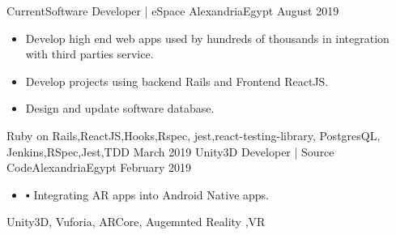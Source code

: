 \begin{experiences}
  \experience
    {Current}{Software Developer | eSpace }{Alexandria}{Egypt}
    {August 2019}   {
                      \begin{itemize}
                        \item Develop high end web apps used by hundreds of thousands in integration with third parties service.
                        \item Develop projects using backend Rails and Frontend ReactJS.
                        \item Design and update software database.
                      \end{itemize}
                    }
                    {Ruby on Rails,ReactJS,Hooks,Rspec,
                    jest,react-testing-library, PostgresQL, Jenkins,RSpec,Jest,TDD}                    
  \emptySeparator
  \experience
    {March 2019	} {Unity3D Developer  | Source Code}{Alexandria}{Egypt}
    {February 2019	}    {
                      \begin{itemize}
                        \item ▪	Integrating AR apps into Android Native apps.                          
                      \end{itemize}
                    }
                    {Unity3D, Vuforia, ARCore, Augemnted Reality ,VR}
\end{experiences}

